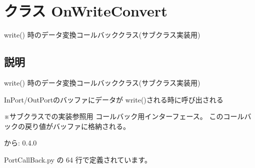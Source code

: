 \section{クラス OnWriteConvert}
\label{classsource__py_1_1_port_call_back_1_1_on_write_convert}
write() 時のデータ変換コールバッククラス(サブクラス実装用)  




\subsection{説明}
write() 時のデータ変換コールバッククラス(サブクラス実装用) 

InPort/OutPortのバッファにデータが write()される時に呼び出される\par
 ※サブクラスでの実装参照用 コールバック用インターフェース。 このコールバックの戻り値がバッファに格納される。

\begin{Desc}
\item[から:]0.4.0 \end{Desc}


 PortCallBack.py の 64 行で定義されています。